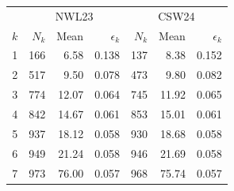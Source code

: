\begin{tabular}{@{}rrrrrrr@{}}\toprule
&\multicolumn{3}{c}{NWL23}&\multicolumn{3}{c}{CSW24}\\
$k$&$N_k$&Mean&$\epsilon_k$&$N_k$&Mean&$\epsilon_k$\\\midrule
1 & 166 & 6.58 & 0.138 & 137 & 8.38 & 0.152\\
2 & 517 & 9.50 & 0.078 & 473 & 9.80 & 0.082\\
3 & 774 & 12.07 & 0.064 & 745 & 11.92 & 0.065\\
4 & 842 & 14.67 & 0.061 & 853 & 15.01 & 0.061\\
5 & 937 & 18.12 & 0.058 & 930 & 18.68 & 0.058\\
6 & 949 & 21.24 & 0.058 & 946 & 21.69 & 0.058\\
7 & 973 & 76.00 & 0.057 & 968 & 75.74 & 0.057\\
\bottomrule\end{tabular}
